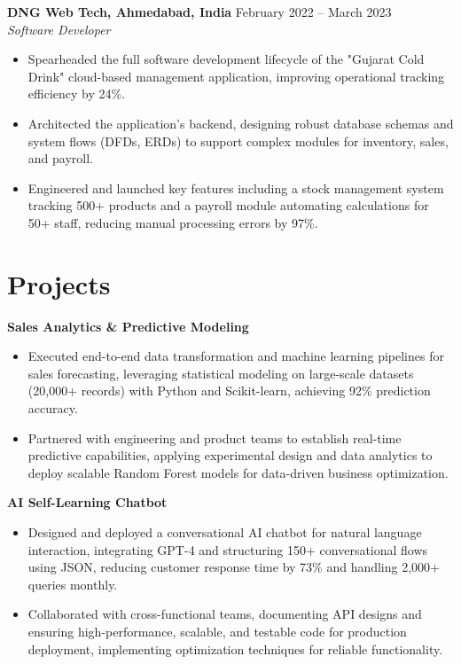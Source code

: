 \documentclass[a4paper,10pt]{article}
\begin{document}
\textbf{DNG Web Tech, Ahmedabad, India} \hfill February 2022 -- March 2023 \\
\textit{Software Developer} \\

\begin{itemize}[leftmargin=*, itemsep=0pt, parsep=1pt] %
\vspace{-7mm}
    \item Spearheaded the full software development lifecycle of the "Gujarat Cold Drink" cloud-based management application, improving operational tracking efficiency by 24\%.
\item Architected the application's backend, designing robust database schemas and system flows (DFDs, ERDs) to support complex modules for inventory, sales, and payroll.
\item Engineered and launched key features including a stock management system tracking 500+ products and a payroll module automating calculations for 50+ staff, reducing manual processing errors by 97\%. 

\end{itemize}

\vspace{-4mm}

\section*{Projects}
\textbf{Sales Analytics \& Predictive Modeling} \\
\begin{itemize}[leftmargin=*, itemsep=0pt, parsep=1pt]
\vspace{-7mm}
    \item Executed end-to-end data transformation and machine learning pipelines for sales forecasting, leveraging statistical modeling on large-scale datasets (20,000+ records) with Python and Scikit-learn, achieving 92\% prediction accuracy.
    \item Partnered with engineering and product teams to establish real-time predictive capabilities, applying experimental design and data analytics to deploy scalable Random Forest models for data-driven business optimization.
    \end{itemize}

\vspace{-2mm}
\textbf{AI Self-Learning Chatbot} \\
\begin{itemize}[leftmargin=*, itemsep=0pt, parsep=1pt]
\vspace{-7mm}
    \item Designed and deployed a conversational AI chatbot for natural language interaction, integrating GPT-4 and structuring 150+ conversational flows using JSON, reducing customer response time by 73\% and handling 2,000+ queries monthly.
    \item Collaborated with cross-functional teams, documenting API designs and ensuring high-performance, scalable, and testable code for production deployment, implementing optimization techniques for reliable functionality.
\end{itemize}

\vspace{-2mm}
\end{document}
